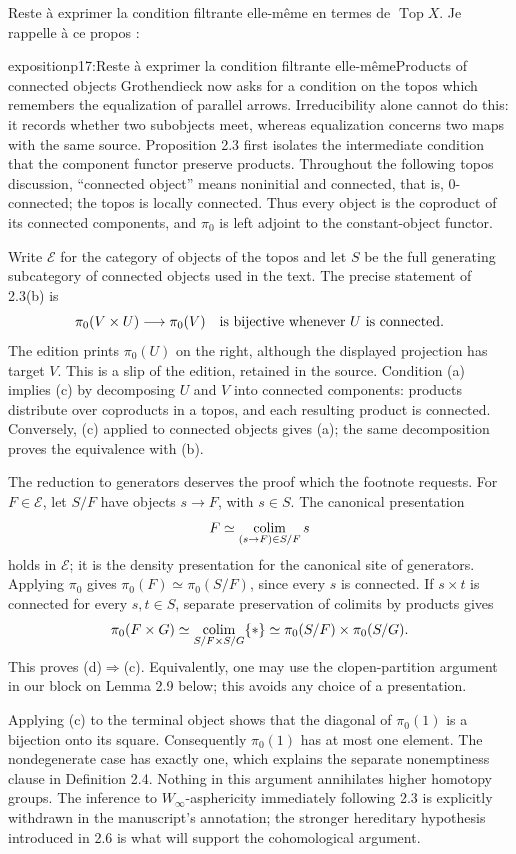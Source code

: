Reste à exprimer la condition filtrante elle-même en termes de $\operatorname{Top} X$. Je rappelle à ce propos :

\begin{dcomment}{exposition}{p17:Reste à exprimer la condition filtrante elle-même}{Products of connected objects}
Grothendieck now asks for a condition on the topos which remembers the equalization of parallel arrows. Irreducibility alone cannot do this: it records whether two subobjects meet, whereas equalization concerns two maps with the same source. Proposition 2.3 first isolates the intermediate condition that the component functor preserve products. Throughout the following topos discussion, ``connected object'' means noninitial and connected, that is, $0$-connected; the topos is locally connected. Thus every object is the coproduct of its connected components, and $\pi _0$ is left adjoint to the constant-object functor.

Write $\mathcal E$ for the category of objects of the topos and let $S$ be the full generating subcategory of connected objects used in the text. The precise statement of 2.3(b) is
\[
 \pi _0(V\times U)\longrightarrow\pi _0(V)
 \quad\hbox{is bijective whenever $U$ is connected.}
\]
The edition prints $\pi _0(U)$ on the right, although the displayed projection has target $V$. This is a slip of the edition, retained in the source. Condition (a) implies (c) by decomposing $U$ and $V$ into connected components: products distribute over coproducts in a topos, and each resulting product is connected. Conversely, (c) applied to connected objects gives (a); the same decomposition proves the equivalence with (b).

The reduction to generators deserves the proof which the footnote requests. For $F\in\mathcal E$, let $S/F$ have objects $s\to F$, with $s\in S$. The canonical presentation
\[
 F\simeq\mathop{\rm colim}_{(s\to F)\in S/F}s
\]
holds in $\mathcal E$; it is the density presentation for the canonical site of generators. Applying $\pi _0$ gives $\pi _0(F)\simeq\pi _0(S/F)$, since every $s$ is connected. If $s\times t$ is connected for every $s,t\in S$, separate preservation of colimits by products gives
\[
 \pi _0(F\times G)
 \simeq\mathop{\rm colim}_{S/F\times S/G}\{*\}
 \simeq\pi _0(S/F)\times\pi _0(S/G).
\]
This proves (d)$\Rightarrow$(c). Equivalently, one may use the clopen-partition argument in our block on Lemma 2.9 below; this avoids any choice of a presentation.

Applying (c) to the terminal object shows that the diagonal of $\pi _0(1)$ is a bijection onto its square. Consequently $\pi _0(1)$ has at most one element. The nondegenerate case has exactly one, which explains the separate nonemptiness clause in Definition 2.4. Nothing in this argument annihilates higher homotopy groups. The inference to $W_\infty$-asphericity immediately following 2.3 is explicitly withdrawn in the manuscript's annotation; the stronger hereditary hypothesis introduced in 2.6 is what will support the cohomological argument.
\end{dcomment}



